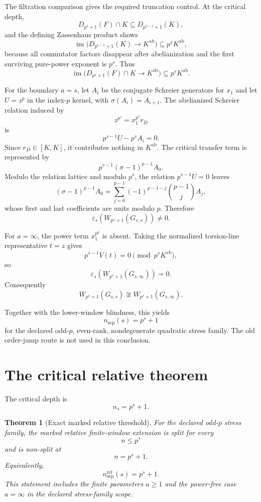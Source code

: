 \documentclass[11pt]{article}
\newtheorem{theorem}{Theorem}[section]
\begin{document}
The filtration comparison gives the required truncation control.  At
the critical depth,
\[
D_{p^s+1}(F)\cap K
\subseteq
D_{p^{s-1}+1}(K),
\]
and the defining Zassenhaus product shows
\[
\operatorname{im}
\bigl(D_{p^{s-1}+1}(K)\to K^{\mathrm{ab}}\bigr)
\subseteq p^sK^{\mathrm{ab}},
\]
because all commutator factors disappear after abelianization and the
first surviving pure-power exponent is $p^s$.  Thus
\[
\boxed{
\operatorname{im}
\bigl(D_{p^s+1}(F)\cap K\to K^{\mathrm{ab}}\bigr)
\subseteq p^sK^{\mathrm{ab}}.
}
\tag{TF$_s$}
\]

For the boundary $a=s$, let $A_i$ be the conjugate Schreier generators
for $x_1$ and let $U=z^p$ in the index-$p$ kernel, with
$\sigma(A_i)=A_{i+1}$.  The abelianized Schreier relation induced by
\[
z^{p^s}=x_1^{p^s}r_D
\]
is
\[
p^{s-1}U-p^sA_i=0.
\]
Since $r_D\in[K,K]$, it contributes nothing in $K^{\mathrm{ab}}$.
The critical transfer term is represented by
\[
p^{s-1}(\sigma-1)^{p-1}A_0.
\]
Modulo the relation lattice and modulo $p^s$, the relation
$p^{s-1}U=0$ leaves
\[
(\sigma-1)^{p-1}A_0
=
\sum_{j=0}^{p-1}
(-1)^{p-1-j}\binom{p-1}{j}A_j,
\]
whose first and last coefficients are units modulo $p$.  Therefore
\[
\boxed{
\varepsilon_s(W_{p^s+1}(G_{s,s}))\ne0.
}
\]

For $a=\infty$, the power term $x_1^{p^a}$ is absent.  Taking the
normalized torsion-line representative $t=z$ gives
\[
p^{s-1}V(t)=0
\pmod{p^sK^{\mathrm{ab}}},
\]
so
\[
\boxed{
\varepsilon_s(W_{p^s+1}(G_{s,\infty}))=0.
}
\]
Consequently
\[
\boxed{
W_{p^s+1}(G_{s,s})
\not\cong
W_{p^s+1}(G_{s,\infty}).
}
\]

Together with the lower-window blindness, this yields
\[
\boxed{
n_{\mathrm{sep}}(s)=p^s+1
}
\]
for the declared odd-$p$, even-rank, nondegenerate quadratic stress
family.  The old order-jump route is not used in this conclusion.

\section{The critical relative theorem}

The critical depth is
\[
n_s=p^s+1.
\]

\begin{theorem}[Exact marked relative threshold]
For the declared odd-$p$ stress family, the marked relative finite-window
extension is split for every
\[
n\le p^s
\]
and is non-split at
\[
n=p^s+1.
\]
Equivalently,
\[
\boxed{
n_{\mathrm{sep}}^{\mathrm{rel}}(s)=p^s+1.
}
\]
This statement includes the finite parameters \(a\ge1\) and the
power-free case \(a=\infty\) in the declared stress-family scope.
\end{theorem}
\end{document}
